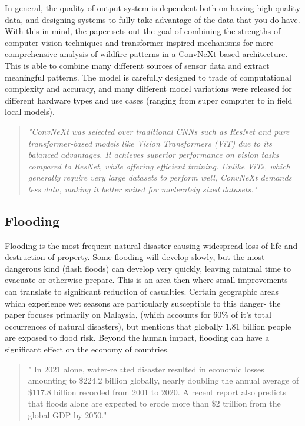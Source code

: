 \documentclass[conference,a4paper]{IEEEtran}
\begin{document}
In general, the quality of output system is dependent both on having high quality data, and designing systems to fully take advantage of the data that you do have. With this in mind, the paper sets out the goal of combining the strengths of computer vision techniques and transformer inspired mechanisms for more comprehensive analysis of wildfire patterns in a ConvNeXt-based architecture. This is able to combine many different sources of sensor data and extract meaningful patterns. The model is carefully designed to trade of computational complexity and accuracy, and many different model variations were released for different hardware types and use cases (ranging from super computer to in field local models).

\begin{quote}
\textit{"ConvNeXt was selected over traditional CNNs such as ResNet and pure transformer-based models like Vision Transformers (ViT) due to its balanced advantages. It achieves superior performance on vision tasks compared to ResNet, while offering efficient training. Unlike ViTs, which generally require very large datasets to perform well, ConvNeXt demands less data, making it better suited for moderately sized datasets."}
\end{quote}
\cite{elbohy2025fusion}


\subsection{Flooding}

Flooding is the most frequent natural disaster causing widespread loss of life and destruction of property. Some flooding will develop slowly, but the most dangerous kind (flash floods) can develop very quickly, leaving minimal time to evacuate or otherwise prepare. This is an area then where small improvements can translate to significant reduction of casualties. Certain geographic areas which experience wet seasons are particularly susceptible to this danger- the paper focuses primarily on Malaysia, (which accounts for 60\% of it's total occurrences of natural disasters), but mentions that globally 1.81 billion people are exposed to flood risk. Beyond the human impact, flooding can have a significant effect on the economy of countries.

\begin{quote}
    " In 2021 alone, water-related disaster resulted in economic losses amounting to \$224.2 billion  globally, nearly doubling the annual average of \$117.8 billion recorded from 2001 to 2020. A recent report also predicts that floods alone are expected to erode more than \$2 trillion from the global GDP by 2050."
\end{quote}
\end{document}
